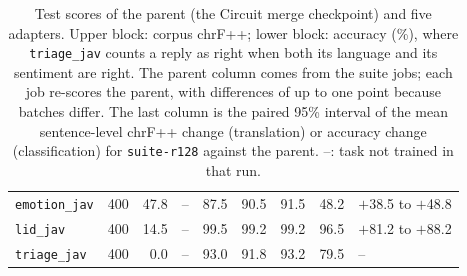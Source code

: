 \documentclass[11pt]{article}
\newcommand{\run}[1]{\texttt{#1}}
\begin{document}
\begin{table}[t]
\begin{tabular}{lrrrrrrrl}
\texttt{emotion\_jav} & 400 & 47.8 & -- & 87.5 & 90.5 & 91.5 & 48.2 & $+$38.5 to $+$48.8 \\
\texttt{lid\_jav} & 400 & 14.5 & -- & 99.5 & 99.2 & 99.2 & 96.5 & $+$81.2 to $+$88.2 \\
\texttt{triage\_jav} & 400 & 0.0 & -- & 93.0 & 91.8 & 93.2 & 79.5 & -- \\
\bottomrule
\end{tabular}
\caption{Test scores of the parent (the Circuit merge checkpoint) and five adapters. Upper block: corpus chrF++;
lower block: accuracy (\%), where \texttt{triage\_jav} counts a reply as right when both its language and its
sentiment are right. The parent column comes from the suite jobs; each job re-scores the parent, with
differences of up to one point because batches differ. The last column is the paired 95\% interval of the mean
sentence-level chrF++ change (translation) or accuracy change (classification) for \run{suite-r128} against the
parent. --: task not
trained in that run.}
\label{tab:tasks}
\end{table}
\end{document}
